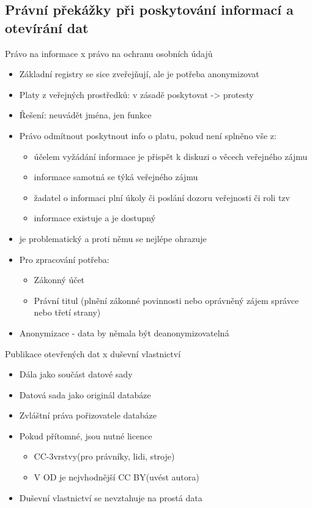 \subsection{Právní překážky při poskytování informací a otevírání dat}
Právo na informace x právo na ochranu osobních údajů
\begin{itemize}
      \item Základní registry se sice zveřejňují, ale je potřeba anonymizovat
      \item Platy z veřejných prostředků: v zásadě poskytovat -> protesty
      \item Řešení: neuvádět jména, jen funkce
      \item Právo odmítnout poskytnout info o platu, pokud není splněno vše z:
            \begin{itemize}
                  \item účelem vyžádání informace je přispět k diskuzi o věcech veřejného zájmu
                  \item informace samotná se týká veřejného zájmu
                  \item žadatel o informaci plní úkoly či poslání dozoru veřejnosti či roli tzv 
                  \item informace existuje a je dostupný
            \end{itemize}
      \item {} je problematický a proti němu se nejlépe ohrazuje
      \item Pro zpracování potřeba:
            \begin{itemize}
                  \item  Zákonný účet
                  \item Právní titul (plnění zákonné povinnosti nebo oprávněný zájem správce nebo třetí
                        strany)
            \end{itemize}
      \item Anonymizace - data by němala být deanonymizovatelná
\end{itemize}
Publikace otevřených dat x duševní vlastnictví
\begin{itemize}
      \item Dála jako součást datové sady
      \item Datová sada jako originál databáze
      \item Zvláštní práva pořizovatele databáze
      \item Pokud přítomné, jsou nutné licence
            \begin{itemize}
                  \item CC-3vrstvy(pro právníky, lidi, stroje)
                  \item V OD je nejvhodnější CC BY(uvést autora)
            \end{itemize}
      \item Duševní vlastnictví se nevztahuje na prostá data
\end{itemize}
